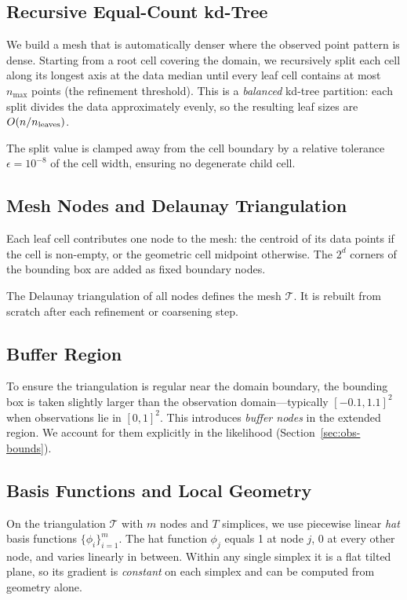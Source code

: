 \documentclass[11pt]{article}
\begin{document}
\subsection{Recursive Equal-Count kd-Tree}

We build a mesh that is automatically denser where the observed point pattern is
dense.  Starting from a root cell covering the domain, we recursively split
each cell along its longest axis at the data median until every leaf cell
contains at most $n_{\max}$ points (the refinement threshold).  This is a
\emph{balanced} kd-tree partition: each split divides the data approximately
evenly, so the resulting leaf sizes are $O(n/n_{\rm leaves})$.

The split value is clamped away from the cell boundary by a relative tolerance
$\epsilon = 10^{-8}$ of the cell width, ensuring no degenerate child cell.

\subsection{Mesh Nodes and Delaunay Triangulation}

Each leaf cell contributes one node to the mesh: the centroid of its data
points if the cell is non-empty, or the geometric cell midpoint otherwise.
The $2^d$ corners of the bounding box are added as fixed boundary nodes.

The Delaunay triangulation of all nodes defines the mesh $\mathcal{T}$.
It is rebuilt from scratch after each refinement or coarsening step.

\subsection{Buffer Region}

To ensure the triangulation is regular near the domain boundary, the bounding
box is taken slightly larger than the observation domain---typically
$[-0.1, 1.1]^2$ when observations lie in $[0,1]^2$.  This introduces
\emph{buffer nodes} in the extended region.  We account for them explicitly in
the likelihood (Section~\ref{sec:obs-bounds}).

\subsection{Basis Functions and Local Geometry}

On the triangulation $\mathcal{T}$ with $m$ nodes and $T$ simplices, we use
piecewise linear \emph{hat} basis functions $\{\phi_i\}_{i=1}^m$.  The hat
function $\phi_j$ equals 1 at node $j$, 0 at every other node, and varies
linearly in between.  Within any single simplex it is a flat tilted plane, so
its gradient is \emph{constant} on each simplex and can be computed from
geometry alone.
\end{document}
